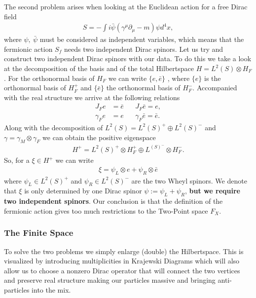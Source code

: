 The second problem arises when looking at the Euclidean action for a free
Dirac field
\begin{align}
    S = - \int i \bar{\psi}(\gamma ^\mu\partial _\mu - m) \psi d^4x,
\end{align}
where $\psi,\ \bar{\psi}$ must be considered as independent variables, which
means that the fermionic action $S_f$ needs two independent Dirac spinors.
Let us try and construct two independent Dirac spinors with our data. To do
this we take a look at the decomposition of the basis and of the total
Hilbertspace $H = L^2(S) \otimes H_F$. For the orthonormal basis of $H_F$ we
can write $\{e, \bar{e}\}$ , where $\{e\}$ is the orthonormal basis of
$H_F^+$ and $\{\bar{e}\}$ the orthonormal basis of $H_F^-$. Accompanied with
the real structure we arrive at the following relations
\begin{align}
    J_F e &= \bar{e} \;\;\;\;\;\; J_F \bar{e} = e, \\
    \gamma_F e &= e  \;\;\;\;\;\;   \gamma_F \bar{e} = \bar{e}.
\end{align}
Along with the decomposition of $L^2(S) = L^2(S)^+ \oplus L^2(S)^-$ and  $\gamma = \gamma _M
\otimes \gamma _F$ we can obtain the positive eigenspace
\begin{align}
    H^+ = L^2(S)^+ \otimes H_F^+ \oplus L^(S)^- \otimes H_F^-.
\end{align}
So, for a $\xi \in H^+$ we can write
\begin{align}
    \xi = \psi _L \otimes e + \psi _R \otimes \bar{e}
\end{align}
where $\psi_L \in L^2(S)^+$ and $\psi _R \in L^2(S)^-$ are the two Wheyl
spinors. We denote that $\xi$ is only determined by one Dirac spinor $\psi :=
\psi_L + \psi _R$, \textbf{but we require two independent spinors}. Our
conclusion is that the definition of the fermionic action gives too much
restrictions to the Two-Point space $F_X$.
\subsubsection{The Finite Space}
To solve the two problems we simply enlarge (double) the Hilbertspace. This
is visualized by introducing multiplicities in Krajewski Diagrams which will also
allow us to choose a nonzero Dirac operator that will connect the two
vertices and preserve real structure making our particles massive and
bringing anti-particles into the mix.


